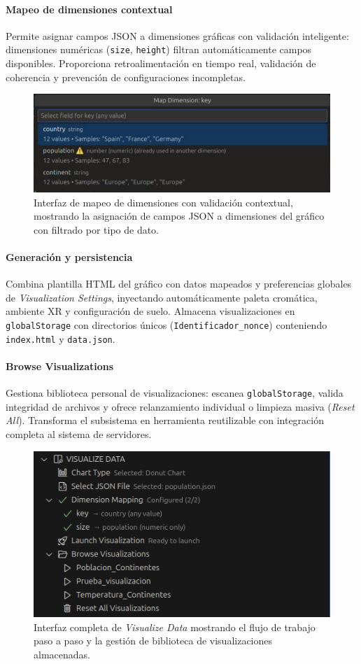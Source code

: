 \documentclass[a4paper, 12pt]{book}
\begin{document}
\paragraph{Mapeo de dimensiones contextual}
Permite asignar campos JSON a dimensiones gráficas con validación inteligente: dimensiones numéricas (\texttt{size}, \texttt{height}) filtran automáticamente campos disponibles. Proporciona retroalimentación en tiempo real, validación de coherencia y prevención de configuraciones incompletas.

\begin{figure}[H]
\centering
\includegraphics[width=0.80\linewidth]{img/ui-dimension-mapping-process.png}
\caption{Interfaz de mapeo de dimensiones con validación contextual, mostrando la asignación de campos JSON a dimensiones del gráfico con filtrado por tipo de dato.}
\label{fig:ui-dimension-mapping-process}
\end{figure}

\paragraph{Generación y persistencia}
Combina plantilla HTML del gráfico con datos mapeados y preferencias globales de \emph{Visualization Settings}, inyectando automáticamente paleta cromática, ambiente XR y configuración de suelo. Almacena visualizaciones en \texttt{globalStorage} con directorios únicos (\texttt{Identificador\_{nonce}}) conteniendo \texttt{index.html} y \texttt{data.json}.

\paragraph{Browse Visualizations}
Gestiona biblioteca personal de visualizaciones: escanea \texttt{globalStorage}, valida integridad de archivos y ofrece relanzamiento individual o limpieza masiva (\emph{Reset All}). Transforma el subsistema en herramienta reutilizable con integración completa al sistema de servidores.

\begin{figure}[H]
\centering
\includegraphics[width=0.60\linewidth]{img/ui-visualize-data.png}
\caption{Interfaz completa de \emph{Visualize Data} mostrando el flujo de trabajo paso a paso y la gestión de biblioteca de visualizaciones almacenadas.}
\label{fig:ui-visualize-data}
\end{figure}
\end{document}

